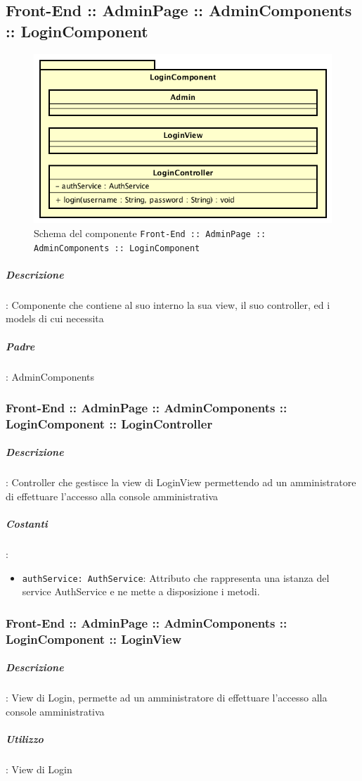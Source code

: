 \documentclass[../ManualeSviluppatore_v1.0.0.tex]{subfiles}
\begin{document}
\newpage
	\subsection{Front-End :: AdminPage :: AdminComponents :: LoginComponent}
	\begin{figure}[!h]
		\centering
		\includegraphics[scale=0.6]{Architettura/Front-End/AdminPage/AdminComponents/LoginComponent.png}
		\caption{Schema del componente \texttt{Front-End :: AdminPage :: AdminComponents :: LoginComponent}}
	\end{figure}
			\subparagraph{Descrizione}: Componente che contiene al suo interno la sua view, il suo controller, ed i models di cui necessita
			\subparagraph{Padre}: AdminComponents
			\subsubsection{Front-End :: AdminPage :: AdminComponents :: LoginComponent :: LoginController}
				\subparagraph{Descrizione}: Controller che gestisce la view di LoginView permettendo ad un amministratore di effettuare l'accesso alla console amministrativa
				\subparagraph{Costanti}:
				\begin{itemize}
					\item \texttt{authService: AuthService}: Attributo che rappresenta una istanza del service AuthService e ne mette a disposizione i metodi.
				\end{itemize}
	  		\subsubsection{Front-End :: AdminPage :: AdminComponents :: LoginComponent :: LoginView}
				\subparagraph{Descrizione}: View di Login, permette ad un amministratore di effettuare l'accesso alla console amministrativa
				\subparagraph{Utilizzo}: View di Login
\newpage
\end{document}
